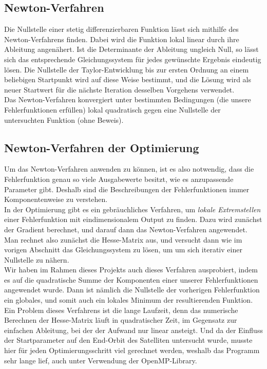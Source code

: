 \subsection{Newton-Verfahren}

Die Nullstelle einer stetig differenzierbaren Funktion lässt sich mithilfe des Newton-Verfahrens finden. Dabei wird die Funktion lokal linear durch ihre Ableitung angenähert. Ist die Determinante der Ableitung ungleich Null, so lässt sich das entsprechende Gleichungssystem für jedes gewünschte Ergebnis eindeutig lösen. Die Nullstelle der Taylor-Entwicklung bis zur ersten Ordnung an einem beliebigen Startpunkt wird auf diese Weise bestimmt, und die Lösung wird als neuer Startwert für die nächste Iteration desselben Vorgehens verwendet. \\
Das Newton-Verfahren konvergiert unter bestimmten Bedingungen (die unsere Fehlerfunktionen erfüllen) lokal quadratisch gegen eine Nullstelle der untersuchten Funktion (ohne Beweis).

\subsection{Newton-Verfahren der Optimierung}

Um das Newton-Verfahren anwenden zu können, ist es also notwendig, dass die Fehlerfunktion genau so viele Ausgabewerte besitzt, wie es anzupassende Parameter gibt. Deshalb sind die Beschreibungen der Fehlerfunktionen immer Komponentenweise zu verstehen.\\
In der Optimierung gibt es ein gebräuchliches Verfahren, um \textit{lokale Extremstellen} einer Fehlerfunktion mit eindimensionalem Output zu finden. Dazu wird zunächst der Gradient berechnet, und darauf dann das Newton-Verfahren angewendet. Man rechnet also zunächst die Hesse-Matrix aus, und versucht dann wie im vorigen Abschnitt das Gleichungssystem zu lösen, um um sich iterativ einer Nullstelle zu nähern. \\
Wir haben im Rahmen dieses Projekts auch dieses Verfahren ausprobiert, indem es auf die quadratische Summe der Komponenten einer unserer Fehlerfunktionen angewendet wurde. Dann ist nämlich die Nullstelle der vorherigen Fehlerfunktion ein globales, und somit auch ein lokales Minimum der resultierenden Funktion. \\
Ein Problem dieses Verfahrens ist die lange Laufzeit, denn das numerische Berechnen der Hesse-Matrix läuft in quadratischer Zeit, im Gegensatz zur einfachen Ableitung, bei der der Aufwand nur linear ansteigt. Und da der Einfluss der Startparameter auf den End-Orbit des Satelliten untersucht wurde, musste hier für jeden Optimierungsschritt viel gerechnet werden, weshalb das Programm sehr lange lief, auch unter Verwendung der OpenMP-Library.


